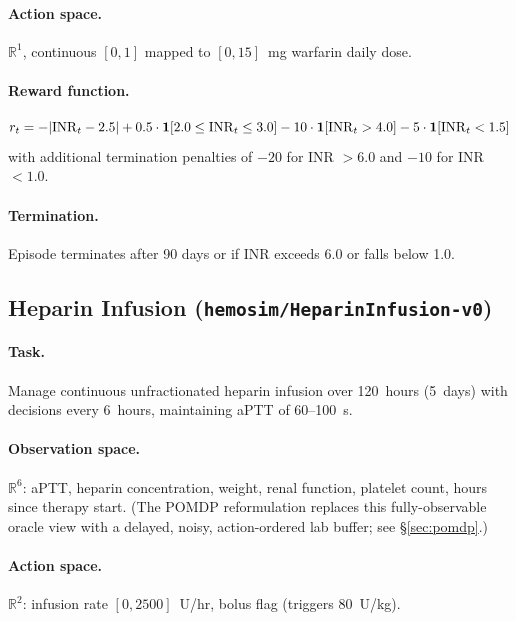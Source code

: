 \documentclass[11pt]{article}
\begin{document}
\paragraph{Action space.} $\mathbb{R}^{1}$, continuous $[0,1]$ mapped to $[0,15]$~mg warfarin daily dose.

\paragraph{Reward function.}
\begin{equation}
  r_t = -|{\rm INR}_t - 2.5| + 0.5 \cdot \mathbf{1}[2.0 \leq {\rm INR}_t \leq 3.0] - 10 \cdot \mathbf{1}[{\rm INR}_t > 4.0] - 5 \cdot \mathbf{1}[{\rm INR}_t < 1.5]
  \label{eq:warfarin_reward}
\end{equation}
with additional termination penalties of $-20$ for INR $> 6.0$ and $-10$ for INR $< 1.0$.

\paragraph{Termination.} Episode terminates after 90 days or if INR exceeds 6.0 or falls below 1.0.

\subsection{Heparin Infusion (\texttt{hemosim/HeparinInfusion-v0})}

\paragraph{Task.} Manage continuous unfractionated heparin infusion over 120~hours (5~days) with decisions every 6~hours, maintaining aPTT of 60--100~s.

\paragraph{Observation space.} $\mathbb{R}^{6}$: aPTT, heparin concentration, weight, renal function, platelet count, hours since therapy start. (The POMDP reformulation replaces this fully-observable oracle view with a delayed, noisy, action-ordered lab buffer; see \S\ref{sec:pomdp}.)

\paragraph{Action space.} $\mathbb{R}^{2}$: infusion rate $[0, 2500]$~U/hr, bolus flag (triggers 80~U/kg).
\end{document}

